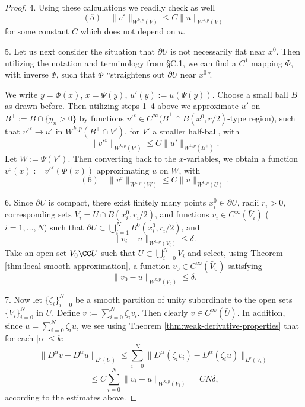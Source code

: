 \begin{proof}
4. Using these calculations we readily check as well
$$(5) \quad \|v^\varepsilon\|_{W^{k,p}(V)} \le C\|u\|_{W^{k,p}(V)}$$
for some constant $C$ which does not depend on $u$.

5. Let us next consider the situation that $\partial U$ is not necessarily flat near $x^0$. Then utilizing the notation and terminology from §C.1, we can find a $C^1$ mapping $\Phi$, with inverse $\Psi$, such that $\Phi$ ``straightens out $\partial U$ near $x^0$''.

\begin{figure}[h]\centering
\end{figure}

We write $y = \Phi(x)$, $x = \Psi(y)$, $u'(y) := u(\Psi(y))$. Choose a small ball $B$ as drawn before. Then utilizing steps 1--4 above we approximate $u'$ on $B^+ := B \cap \{y_n > 0\}$ by functions $v'^\varepsilon \in C^\infty(\bar B^+ \cap \bar B(x^0,r/2)$-type region$)$, such that $v'^\varepsilon \to u'$ in $W^{k,p}(B^+ \cap V')$, for $V'$ a smaller half-ball, with
$$\|v'^\varepsilon\|_{W^{k,p}(V')} \le C\|u'\|_{W^{k,p}(B^+)}.$$
Let $W := \Psi(V')$. Then converting back to the $x$-variables, we obtain a function $v^\varepsilon(x) := v'^\varepsilon(\Phi(x))$ approximating $u$ on $W$, with
$$(6) \quad \|v^\varepsilon\|_{W^{k,p}(W)} \le C\|u\|_{W^{k,p}(U)}.$$

6. Since $\partial U$ is compact, there exist finitely many points $x_i^0 \in \partial U$, radii $r_i > 0$, corresponding sets $V_i = U \cap B(x_i^0, r_i/2)$, and functions $v_i \in C^\infty(\bar V_i)$ ($i = 1,\ldots,N$) such that $\partial U \subset \bigcup_{i=1}^N B^0(x_i^0, r_i/2)$, and
$$\|v_i - u\|_{W^{k,p}(V_i)} \le \delta.$$
Take an open set $V_0 \CC U$ such that $U \subset \bigcup_{i=0}^N V_i$ and select, using Theorem \ref{thm:local-smooth-approximation}, a function $v_0 \in C^\infty(\bar V_0)$ satisfying
$$\|v_0 - u\|_{W^{k,p}(V_0)} \le \delta.$$

7. Now let $\{\zeta_i\}_{i=0}^N$ be a smooth partition of unity subordinate to the open sets $\{V_i\}_{i=0}^N$ in $U$. Define $v := \sum_{i=0}^N \zeta_i v_i$. Then clearly $v \in C^\infty(\bar U)$. In addition, since $u = \sum_{i=0}^N \zeta_i u$, we see using Theorem \ref{thm:weak-derivative-properties} that for each $|\alpha| \le k$:
$$\|D^\alpha v - D^\alpha u\|_{L^p(U)} \le \sum_{i=0}^N \|D^\alpha(\zeta_i v_i) - D^\alpha(\zeta_i u)\|_{L^p(V_i)}$$
$$\le C \sum_{i=0}^N \|v_i - u\|_{W^{k,p}(V_i)} = CN\delta,$$
according to the estimates above.
\end{proof}


